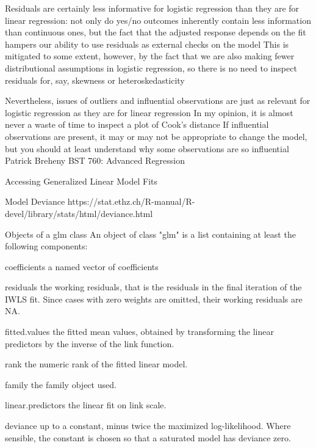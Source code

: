 Residuals are certainly less informative for logistic regression
than they are for linear regression: not only do yes/no
outcomes inherently contain less information than continuous
ones, but the fact that the adjusted response depends on the
fit hampers our ability to use residuals as external checks on
the model
This is mitigated to some extent, however, by the fact that we
are also making fewer distributional assumptions in logistic
regression, so there is no need to inspect residuals for, say,
skewness or heteroskedasticity


Nevertheless, issues of outliers and influential observations are
just as relevant for logistic regression as they are for linear
regression
In my opinion, it is almost never a waste of time to inspect a
plot of Cook’s distance
If influential observations are present, it may or may not be
appropriate to change the model, but you should at least
understand why some observations are so influential
Patrick Breheny BST 760: Advanced Regression 




Accessing Generalized Linear Model Fits



Model Deviance
https://stat.ethz.ch/R-manual/R-devel/library/stats/html/deviance.html


Objects of a glm class
An object of class "glm" is a list containing at least the following components: 

coefficients a named vector of coefficients
 
residuals the working residuals, that is the residuals in the final iteration of the IWLS fit. Since cases with zero weights are omitted, their working residuals are NA.
 
fitted.values the fitted mean values, obtained by transforming the linear predictors by the inverse of the link function.
 
rank the numeric rank of the fitted linear model.
 
family the family object used.
 
linear.predictors the linear fit on link scale.
 
deviance up to a constant, minus twice the maximized log-likelihood. Where sensible, the constant is chosen so that a saturated model has deviance zero.
 
